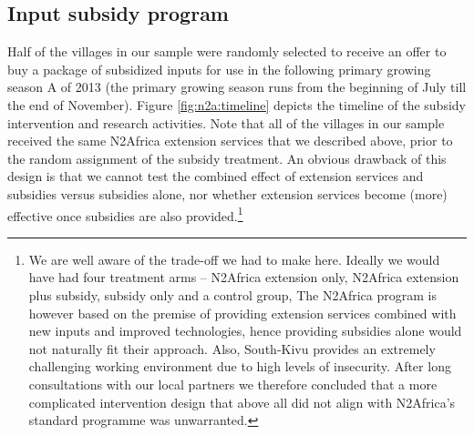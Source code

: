 \subsection{Input subsidy program} 
Half of the villages in our sample were randomly selected to receive an offer to buy a package of subsidized inputs for use in the following primary growing season A of 2013 (the primary growing season runs from the beginning of July till the end of November). Figure \ref{fig:n2a:timeline} depicts the timeline of the subsidy intervention and research activities. Note that all of the villages in our sample received the same N2Africa extension services that we described above, prior to the random assignment of the subsidy treatment. An obvious drawback of this design is that we cannot test the combined effect of extension services and subsidies versus subsidies alone, nor whether extension services become (more) effective once subsidies are also provided.\footnote{We are well aware of the trade-off we had to make here. Ideally we would have had four treatment arms – N2Africa extension only, N2Africa extension plus subsidy, subsidy only and a control group, The N2Africa program is however based on the premise of providing extension services combined with new inputs and improved technologies, hence providing subsidies alone would not naturally fit their approach. Also, South-Kivu provides an extremely challenging working environment due to high levels of insecurity. After long consultations with our local partners we therefore concluded that a more complicated intervention design that above all did not align with N2Africa’s standard programme was unwarranted.}



